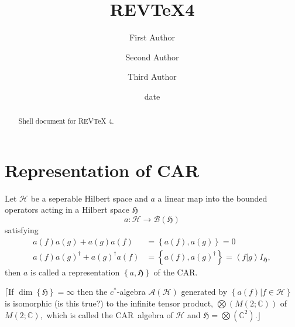 \documentclass[aps,preprint]{revtex4}%
\begin{document}
\title[Short title for running header]{REV\TeX4}
\author{First Author}
\author{Second Author}
\author{Third Author}

\begin{abstract}
Shell document for REV\TeX{} 4.

\end{abstract}
\date[Date text]{date}




\maketitle
\tableofcontents


\section{Representation of CAR}

Let $\mathcal{H}$ be a seperable Hilbert space and $a$ a linear map into the
bounded operators acting in a Hilbert space $\mathfrak{H}$
\begin{equation}
a:\mathcal{H}\rightarrow\mathcal{B}\left(  \mathfrak{H}\right)
\end{equation}
satisfying
\begin{align}
a\left(  f\right)  a\left(  g\right)  +a\left(  g\right)  a\left(  f\right)
&  =\left\{  a\left(  f\right)  ,a\left(  g\right)  \right\}  =0\\
a\left(  f\right)  a\left(  g\right)  ^{\dagger}+a\left(  g\right)  ^{\dagger
}a\left(  f\right)   &  =\left\{  a\left(  f\right)  ,a\left(  g\right)
^{\dagger}\right\}  =\left\langle f\left\vert g\right.  \right\rangle
I_{\mathfrak{H}},
\end{align}
then $a$ is called a representation $\left\{  a,\mathfrak{H}\right\}  $ of the CAR.

$\lceil$If $\dim\left\{  \mathfrak{H}\right\}  =\infty$ then the $c^{\ast}%
$-algebra $\mathcal{A}\left(  \mathcal{H}\right)  $ generated by $\left\{
\left.  a\left(  f\right)  \right\vert f\in\mathcal{H}\right\}  $ is
isomorphic (is this true?) to the infinite tensor product, $%
{\displaystyle\bigotimes}
\left(  M\left(  2;\mathbb{C}\right)  \right)  $ of $M\left(  2;\mathbb{C}%
\right)  ,$ which is called the CAR\ algebra of $\mathcal{H}$ and
$\mathfrak{H=}%
{\displaystyle\bigotimes}
\left(  \mathbb{C}^{2}\right)  .\rfloor$
\end{document}

